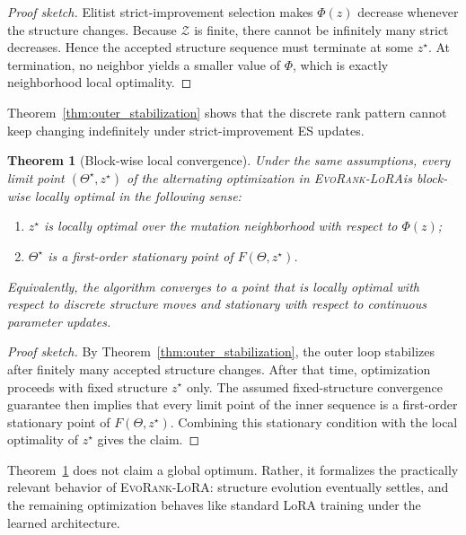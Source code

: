 \documentclass{article}
\newtheorem{theorem}{Theorem}
\newcommand{\method}{\textsc{EvoRank-LoRA}}
\begin{document}
\begin{proof}[Proof sketch]
Elitist strict-improvement selection makes $\Phi(z)$ decrease whenever the structure changes. Because $\mathcal{Z}$ is finite, there cannot be infinitely many strict decreases. Hence the accepted structure sequence must terminate at some $z^\star$. At termination, no neighbor yields a smaller value of $\Phi$, which is exactly neighborhood local optimality.
\end{proof}

Theorem~\ref{thm:outer_stabilization} shows that the discrete rank pattern cannot keep changing indefinitely under strict-improvement ES updates.

\begin{theorem}[Block-wise local convergence]
\label{thm:block_convergence}
Under the same assumptions, every limit point $(\Theta^\star, z^\star)$ of the alternating optimization in \method is block-wise locally optimal in the following sense:
\begin{enumerate}[leftmargin=1.2em]
    \item $z^\star$ is locally optimal over the mutation neighborhood with respect to $\Phi(z)$;
    \item $\Theta^\star$ is a first-order stationary point of $F(\Theta, z^\star)$.
\end{enumerate}
Equivalently, the algorithm converges to a point that is locally optimal with respect to discrete structure moves and stationary with respect to continuous parameter updates.
\end{theorem}

\begin{proof}[Proof sketch]
By Theorem~\ref{thm:outer_stabilization}, the outer loop stabilizes after finitely many accepted structure changes. After that time, optimization proceeds with fixed structure $z^\star$ only. The assumed fixed-structure convergence guarantee then implies that every limit point of the inner sequence is a first-order stationary point of $F(\Theta, z^\star)$. Combining this stationary condition with the local optimality of $z^\star$ gives the claim.
\end{proof}

Theorem~\ref{thm:block_convergence} does not claim a global optimum. Rather, it formalizes the practically relevant behavior of \method: structure evolution eventually settles, and the remaining optimization behaves like standard LoRA training under the learned architecture.
\end{document}
